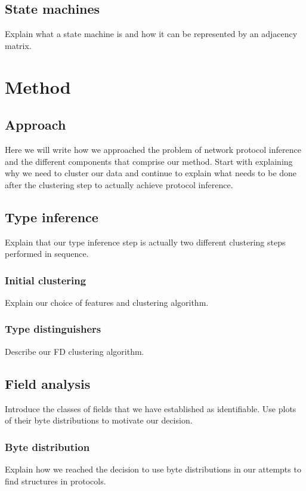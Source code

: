 \documentclass[a4paper]{report}
\begin{document}
\section{State machines}
Explain what a state machine is and how it can be represented by an adjacency
matrix.

\chapter{Method}

\section{Approach}
Here we will write how we approached the problem of network protocol inference
and the different components that comprise our method. Start with explaining
why we need to cluster our data and continue to explain what needs to be done
after the clustering step to actually achieve protocol inference.

\section{Type inference}
Explain that our type inference step is actually two different clustering steps
performed in sequence.

\subsection{Initial clustering}
Explain our choice of features and clustering algorithm.

\subsection{Type distinguishers}
Describe our FD clustering algorithm.

\section{Field analysis}
Introduce the classes of fields that we have established as identifiable. Use
plots of their byte distributions to motivate our decision.

\subsection{Byte distribution}
Explain how we reached the decision to use byte distributions in our attempts
to find structures in protocols.
\end{document}
